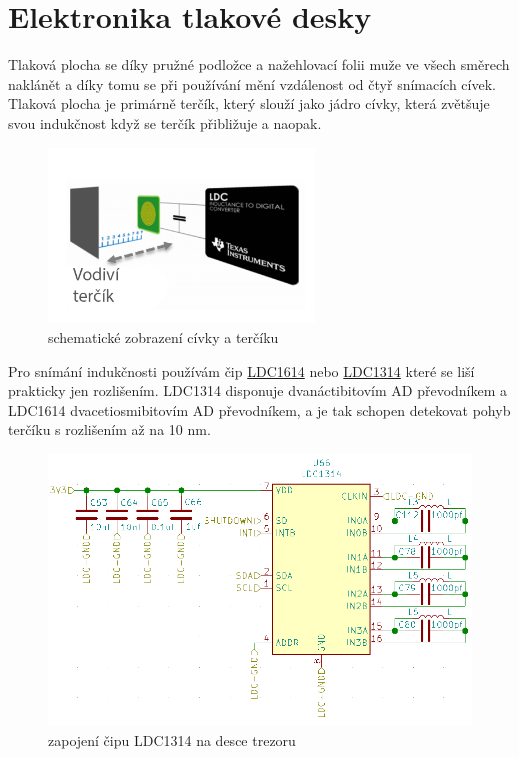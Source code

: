 \section{Elektronika tlakové desky}


Tlaková plocha se díky pružné podložce a nažehlovací folii muže ve všech směrech naklánět a díky tomu se při používání mění vzdálenost od čtyř snímacích
cívek. Tlaková plocha je primárně terčík, který slouží jako jádro cívky, která zvětšuje svou indukčnost když se terčík přibližuje a naopak.

\begin{figure}[htbp]
    \centering
    \includegraphics[width=200pt]{kapitoly/obrazky/E4/elektronika_tlakove_desky/civka_tercik_LDC.png}
    \caption{schematické zobrazení cívky a terčíku}
    \label{fig:E4-sch_civka_tercik}
\end{figure}

Pro snímání indukčnosti používám čip \href{https://www.ti.com/lit/ds/symlink/ldc1612.pdf?ts=1612018658531&ref_url=https%253A%252F%252Fwww.google.com%252F}{LDC1614}
nebo \href{https://www.ti.com/lit/ds/symlink/ldc1312.pdf?ts=1612017390818&ref_url=https%253A%252F%252Fwww.google.com%252F}{LDC1314} 
které se liší prakticky jen rozlišením. LDC1314 disponuje dvanáctibitovím AD převodníkem a LDC1614 dvacetiosmibitovím AD převodníkem, 
a je tak schopen detekovat pohyb terčíku s rozlišením až na 10 nm.

\begin{figure}[htbp]
    \centering
    \includegraphics[width=\textwidth]{kapitoly/obrazky/E4/elektronika_tlakove_desky/moje_zapojeni.png}
    \caption{zapojení čipu LDC1314 na desce trezoru}
    \label{fig:E4-LDC}
\end{figure}


